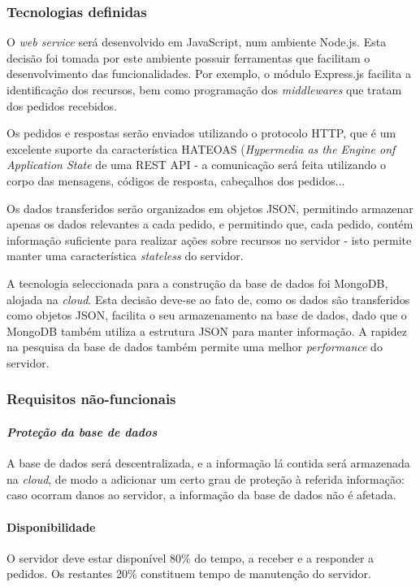 \documentclass[12pt]{article} %
\begin{document}
\pagebreak

\subsubsection{Tecnologias definidas}
O \textit{web service} será desenvolvido em JavaScript, num ambiente Node.js. Esta decisão foi tomada por este ambiente possuir ferramentas que facilitam o desenvolvimento das  funcionalidades. Por exemplo, o módulo Express.js facilita a identificação dos recursos, bem como programação dos \textit{middlewares} que tratam dos pedidos recebidos.\par
Os pedidos e respostas serão enviados utilizando o protocolo HTTP, que é um excelente suporte da característica HATEOAS (\textit{Hypermedia as the Engine onf Application State} de uma REST API - a comunicação será feita utilizando o corpo das mensagens, códigos de resposta, cabeçalhos dos pedidos...\par Os dados transferidos serão organizados em objetos JSON, permitindo armazenar apenas os dados relevantes a cada pedido, e permitindo que, cada pedido, contém informação suficiente para realizar ações sobre recursos no servidor - isto permite manter uma característica \textit{stateless} do servidor.\par
A tecnologia seleccionada para a construção da base de dados foi MongoDB, alojada na \textit{cloud}. Esta decisão deve-se ao fato de, como os dados são transferidos como objetos JSON, facilita o seu armazenamento na base de dados, dado que o MongoDB também utiliza a estrutura JSON para manter informação. A rapidez na pesquisa da base de dados também permite uma melhor \textit{performance} do servidor.

\pagebreak


\subsubsection{Requisitos não-funcionais}

\paragraph{\textit{Proteção da base de dados}} 
A base de dados será descentralizada, e a informação lá contida será armazenada na \textit{cloud}, de modo a adicionar um certo grau de proteção à referida informação: caso ocorram danos ao servidor, a informação da base de dados não é afetada. 

\paragraph{Disponibilidade}
O servidor deve estar disponível 80\% do tempo, a receber e a responder a pedidos. Os restantes 20\% constituem tempo de manutenção do servidor.\par
\end{document}
